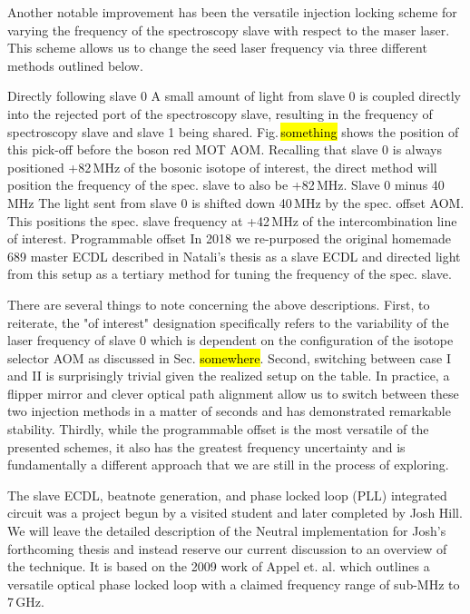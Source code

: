Another notable improvement has been the versatile injection locking scheme for varying the frequency of the spectroscopy slave with respect to the maser laser.
This scheme allows us to change the seed laser frequency via three different methods outlined below.
\begin{outline}[enumerate]
	\1 Directly following slave 0
		\2 A small amount of light from slave 0 is coupled directly into the rejected port of the spectroscopy slave, resulting in the frequency of spectroscopy slave and slave 1 being shared. 
		Fig.\,\hl{something} shows the position of this pick-off before the boson red MOT AOM. 
		Recalling that slave 0 is always positioned +82\,MHz of the bosonic isotope of interest, the direct method will position the frequency of the spec. slave to also be +82\,MHz.
	\1 Slave 0 minus 40\,MHz
		\2 The light sent from slave 0 is shifted down 40\,MHz by the spec. offset AOM. This positions the spec. slave frequency at +42\,MHz of the intercombination line of interest.
	\1 Programmable offset
		\2 In 2018 we re-purposed the original homemade 689 master ECDL described in Natali's thesis as a slave ECDL and directed light from this setup as a tertiary method for tuning the frequency of the spec. slave. 
\end{outline}
There are several things to note concerning the above descriptions.
First, to reiterate, the "of interest" designation specifically refers to the variability of the laser frequency of slave 0 which is dependent on the configuration of the isotope selector AOM as discussed in Sec. \hl{somewhere}.
Second, switching between case I and II is surprisingly trivial given the realized setup on the table.
In practice, a flipper mirror and clever optical path alignment allow us to switch between these two injection methods in a matter of seconds and has demonstrated remarkable stability.
Thirdly, while the programmable offset is the most versatile of the presented schemes, it also has the greatest frequency uncertainty and is fundamentally a different approach that we are still in the process of exploring.

The slave ECDL, beatnote generation, and phase locked loop (PLL) integrated circuit was a project begun by a visited student and later completed by Josh Hill.
We will leave the detailed description of the Neutral implementation for Josh's forthcoming thesis and instead reserve our current discussion to an overview of the technique.
It is based on the 2009 work of Appel et. al. \cite{zfr08expansion} which outlines a versatile optical phase locked loop with a claimed frequency range of sub-MHz to 7\,GHz.

